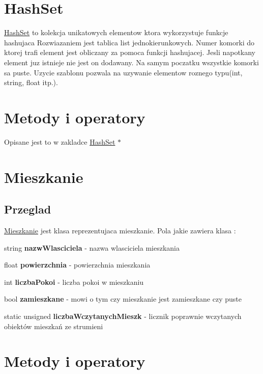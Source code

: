 \hypertarget{index_intro_sec}{}\section{Hash\+Set}\label{index_intro_sec}
\hyperlink{class_hash_set}{Hash\+Set} to kolekcja unikatowych elementow ktora wykorzystuje funkcje \textquotesingle{}hashujaca\textquotesingle{} Rozwiazaniem jest tablica list jednokierunkowych. Numer komorki do ktorej trafi element jest obliczany za pomoca funkcji \textquotesingle{}hashujacej\textquotesingle{}. Jesli napotkany element juz istnieje nie jest on dodawany. Na samym poczatku wszystkie komorki sa puste. Uzycie szablonu pozwala na uzywanie elementow roznego typu(int, string, float itp.). \hypertarget{index_intro_sec3}{}\section{Metody i operatory}\label{index_intro_sec3}
Opisane jest to w zakladce \hyperlink{class_hash_set}{Hash\+Set} $\ast$\hypertarget{index_intro_sec4}{}\section{Mieszkanie}\label{index_intro_sec4}
\hypertarget{index_step1}{}\subsection{Przeglad}\label{index_step1}
\hyperlink{class_mieszkanie}{Mieszkanie} jest klasa reprezentujaca mieszkanie. Pola jakie zawiera klasa \+: \begin{DoxyItemize}
\item string {\bfseries nazw\+Wlasciciela} -\/ nazwa wlasciciela mieszkania\item float {\bfseries powierzchnia} -\/ powierzchnia mieszkania\item int {\bfseries liczba\+Pokoi} -\/ liczba pokoi w mieszkaniu\item bool {\bfseries zamieszkane} -\/ mowi o tym czy mieszkanie jest zamieszkane czy puste \item static unsigned {\bfseries liczba\+Wczytanych\+Mieszk} -\/ licznik poprawnie wczytanych obiektów mieszkań ze strumieni \end{DoxyItemize}
\hypertarget{index_intro_sec10}{}\section{Metody i operatory}\label{index_intro_sec10}
